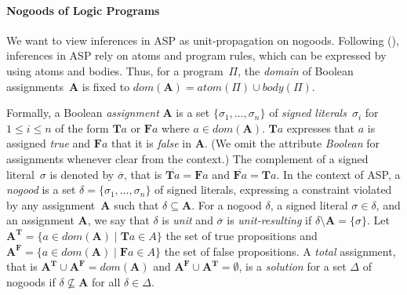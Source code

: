 \documentclass[letterpaper]{article}
\newcommand{\assignment}{\mathbf{A}}
\newcommand{\tass}[1]{\mathbf{T}#1}
\newcommand{\fass}[1]{\mathbf{F}#1}
\newcommand{\Tass}{\assignment^\mathbf{T}}
\newcommand{\Fass}{\assignment^\mathbf{F}}
\newcommand{\atom}[1]{atom(#1)}
\newcommand{\body}[1]{body(#1)}
\newcommand{\domain}[1]{dom(#1)}
\newcommand{\citeap}[1]{\citeauthor{#1} (\citeyear{#1})}
\begin{document}
\paragraph{Nogoods of Logic Programs}
We want to view inferences in ASP as unit-propagation on nogoods. 
Following \citeap{gekanesc07a}, inferences in ASP rely on atoms and program rules, which can be expressed by using atoms and bodies. Thus, for a program~$\Pi$, the \emph{domain} of Boolean assignments~$\assignment$ is fixed to $\domain{\assignment} = \atom{\Pi} \cup \body{\Pi}$.

Formally, a Boolean \emph{assignment} $\assignment$ is a set $\{ \sigma_1, \dots, \sigma_n \}$ of \emph{signed literals}~$\sigma_i$ for $1 \leq i \leq n$ of the form $\tass{a}$ or $\fass{a}$ where $a \in \domain{\assignment}$. $\tass{a}$ expresses that $a$ is assigned \emph{true} and $\fass{a}$ that it is \emph{false} in $\assignment$. (We omit the attribute \emph{Boolean} for assignments whenever clear from the context.) The complement of a signed literal~$\sigma$ is denoted by $\overline{\sigma}$, that is $\overline{\tass{a}} = \fass{a}$ and $\overline{\fass{a}} = \tass{a}$.
In the context of ASP, a \emph{nogood} is a set $\delta = \{ \sigma_1, \dots, \sigma_n \}$ of signed literals, expressing a constraint violated by any assignment~$\assignment$ such that $\delta \subseteq \assignment$.
For a nogood $\delta$, a signed literal $\sigma \in \delta$, and an assignment $\assignment$, we say that $\delta$ is \emph{unit} and $\overline{\sigma}$ is \emph{unit-resulting} if $\delta \setminus \assignment = \{\sigma\}$.
Let $\Tass = \{ a \in \domain{\assignment} \mid \tass{a} \in A \}$ the set of true propositions and $\Fass = \{ a \in \domain{\assignment} \mid \fass{a} \in A \}$ the set of false propositions. A \emph{total} assignment, that is $\Tass \cup \Fass = \domain{\assignment}$ and $\Fass \cup \Tass = \emptyset$, is a \emph{solution} for a set $\Delta$ of nogoods if $\delta \not\subseteq \assignment$ for all $\delta \in \Delta$.
\end{document}
